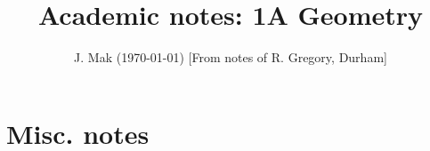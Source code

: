 \documentclass[10pt,notitlepage]{revtex4-1}
\begin{document}

\title{Academic notes: 1A Geometry} %


\author{J. Mak (\today) [From notes of R. Gregory, Durham]}








\maketitle %



\section*{Misc. notes}
\end{document}
